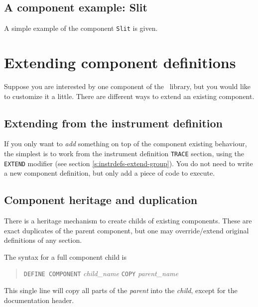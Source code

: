 \subsection{A component example: Slit}
\label{s:slit}
A simple example of the component \texttt{Slit} is given.



\section{Extending component definitions}
\label{s:compdefs-extend}

Suppose you are interested by one component of the \MCS\ library, but you would like to customize it a little. There are different ways to extend an existing component.

\subsection{Extending from the instrument definition}

If you only want to \emph{add} something on top of the component existing behaviour, the simplest is to work from the instrument definition \texttt{TRACE} section, using the \texttt{EXTEND} modifier (see section \ref{s:instrdefs-extend-group}). You do not need to write a new component definition, but only add a piece of code to execute.

\subsection{Component heritage and duplication}

There is a heritage mechanism to create childs of existing components. These are exact duplicates of the parent component, but one may override/extend original definitions of any section.

The syntax for a full component child is
\begin{quote}
  \texttt{DEFINE COMPONENT} {\it child\_name} \texttt{COPY} {\it parent\_name}
\end{quote}
This single line will copy all parts of the {\it parent} into the {\it child}, except for the documentation header.

